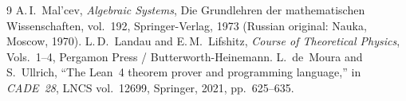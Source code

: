 \documentclass[11pt,a4paper]{article}
\theoremstyle{plain}
\theoremstyle{definition}
\begin{document}
\begin{thebibliography}{9}
A.\,I.~Mal'cev, \emph{Algebraic Systems}, Die Grundlehren der mathematischen Wissenschaften, vol.~192, Springer-Verlag, 1973 (Russian original: Nauka, Moscow, 1970).
L.\,D.~Landau and E.\,M.~Lifshitz, \emph{Course of Theoretical Physics}, Vols.~1--4, Pergamon Press / Butterworth-Heinemann.
L.~de~Moura and S.~Ullrich, ``The Lean~4 theorem prover and programming language,'' in \emph{CADE~28}, LNCS vol.~12699, Springer, 2021, pp.~625--635.
\end{thebibliography}
\end{document}
